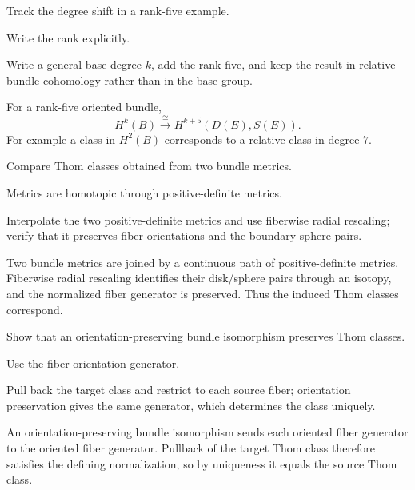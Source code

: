 \begin{exercise}\label{exr:viii31-15}
Track the degree shift in a rank-five example.
\end{exercise}
\begin{hint}
Write the rank explicitly.

Write a general base degree \(k\), add the rank five, and keep the result in relative bundle cohomology rather than in the base group.
\end{hint}
\begin{solution}
For a rank-five oriented bundle,
\[
H^k(B)\xrightarrow{\cong}H^{k+5}(D(E),S(E)).
\]
For example a class in \(H^2(B)\) corresponds to a relative class in degree \(7\).
\end{solution}

\begin{exercise}\label{exr:viii31-16}
Compare Thom classes obtained from two bundle metrics.
\end{exercise}
\begin{hint}
Metrics are homotopic through positive-definite metrics.

Interpolate the two positive-definite metrics and use fiberwise radial rescaling; verify that it preserves fiber orientations and the boundary sphere pairs.
\end{hint}
\begin{solution}
Two bundle metrics are joined by a continuous path of positive-definite metrics. Fiberwise radial rescaling identifies their disk/sphere pairs through an isotopy, and the normalized fiber generator is preserved. Thus the induced Thom classes correspond.
\end{solution}

\begin{exercise}\label{exr:viii31-17}
Show that an orientation-preserving bundle isomorphism preserves Thom classes.
\end{exercise}
\begin{hint}
Use the fiber orientation generator.

Pull back the target class and restrict to each source fiber; orientation preservation gives the same generator, which determines the class uniquely.
\end{hint}
\begin{solution}
An orientation-preserving bundle isomorphism sends each oriented fiber generator to the oriented fiber generator. Pullback of the target Thom class therefore satisfies the defining normalization, so by uniqueness it equals the source Thom class.
\end{solution}


